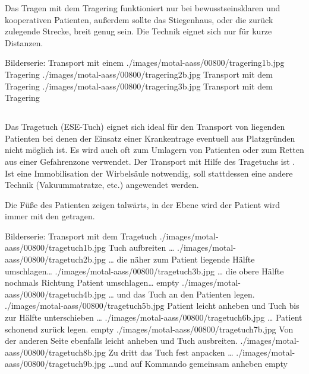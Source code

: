 \Text
{{\TxBeschreibung}}%
{%
\label{topic:tragering}%
Das Tragen mit dem Tragering funktioniert nur bei bewusstseinsklaren und
kooperativen Patienten, außerdem sollte das Stiegenhaus, oder die zurück
zulegende Strecke, breit genug sein. Die Technik eignet sich nur für kurze
Distanzen.
}%


\begin{PictureSeriesWide}{}{Bilderserie: Transport mit einem
 }
{./images/motal-aass/00800/tragering1b.jpg}
{Tragering}
{./images/motal-aass/00800/tragering2b.jpg}
{Transport mit dem Tragering}
{./images/motal-aass/00800/tragering3b.jpg}
{Transport mit dem Tragering}
{}
{}
\end{PictureSeriesWide}






\subsection{}


\Text
{{\TxBeschreibung}}%
{%
%
\label{topic:bergetuch}%
\label{topic:tragetuch-taetigkeit}%
Das Tragetuch (ESE-Tuch) eignet sich ideal für den Transport
von liegenden Patienten bei denen der Einsatz einer
Krankentrage eventuell aus Platzgründen nicht möglich ist. Es wird auch
oft zum Umlagern von Patienten oder zum Retten aus einer
Gefahrenzone verwendet. 
Der Transport mit Hilfe des Tragetuchs ist . Ist eine Immobilisation der
Wirbelsäule notwendig, soll stattdessen eine andere Technik
(Vakuummatratze, etc.) angewendet werden.

Die Füße des Patienten zeigen
talwärts, in der Ebene wird der Patient wird immer mit den
 getragen.
}%




\begin{PictureSeriesWide}{}{Bilderserie: Transport mit dem Tragetuch}
{./images/motal-aass/00800/tragetuch1b.jpg}%
{Tuch aufbreiten \ldots}
{./images/motal-aass/00800/tragetuch2b.jpg}%
{{\ldots} die näher zum Patient liegende Hälfte
umschlagen\ldots }
{./images/motal-aass/00800/tragetuch3b.jpg}%
{{\ldots} die obere Hälfte nochmals Richtung Patient
umschlagen\ldots }
{empty}%
{}
%
{./images/motal-aass/00800/tragetuch4b.jpg}%
{{\ldots} und das Tuch an den Patienten legen.}
{./images/motal-aass/00800/tragetuch5b.jpg}%
{Patient leicht anheben und Tuch bis zur Hälfte
unterschieben \ldots}
{./images/motal-aass/00800/tragetuch6b.jpg}%
{{\ldots} Patient schonend zurück legen.}
{empty}%
{}
%
{./images/motal-aass/00800/tragetuch7b.jpg}%
{Von der anderen Seite ebenfalls leicht anheben und
Tuch ausbreiten. }
{./images/motal-aass/00800/tragetuch8b.jpg}%
{Zu dritt das Tuch fest anpacken \ldots }
{./images/motal-aass/00800/tragetuch9b.jpg}%
{\ldots und auf Kommando gemeinsam anheben}
{empty}%
{}
\end{PictureSeriesWide}



